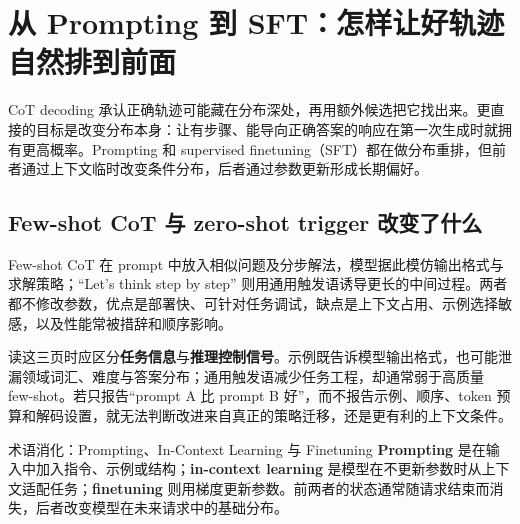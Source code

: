 \section{从 Prompting 到 SFT：怎样让好轨迹自然排到前面}

CoT decoding 承认正确轨迹可能藏在分布深处，再用额外候选把它找出来。更直接的目标是改变分布本身：让有步骤、能导向正确答案的响应在第一次生成时就拥有更高概率。Prompting 和 supervised finetuning（SFT）都在做分布重排，但前者通过上下文临时改变条件分布，后者通过参数更新形成长期偏好。


\subsection{Few-shot CoT 与 zero-shot trigger 改变了什么}

Few-shot CoT 在 prompt 中放入相似问题及分步解法，模型据此模仿输出格式与求解策略；“Let's think step by step” 则用通用触发语诱导更长的中间过程。两者都不修改参数，优点是部署快、可针对任务调试，缺点是上下文占用、示例选择敏感，以及性能常被措辞和顺序影响。




读这三页时应区分\textbf{任务信息}与\textbf{推理控制信号}。示例既告诉模型输出格式，也可能泄漏领域词汇、难度与答案分布；通用触发语减少任务工程，却通常弱于高质量 few-shot。若只报告“prompt A 比 prompt B 好”，而不报告示例、顺序、token 预算和解码设置，就无法判断改进来自真正的策略迁移，还是更有利的上下文条件。


\begin{knowledgebox}{术语消化：Prompting、In-Context Learning 与 Finetuning}
\textbf{Prompting} 是在输入中加入指令、示例或结构；\textbf{in-context learning} 是模型在不更新参数时从上下文适配任务；\textbf{finetuning} 则用梯度更新参数。前两者的状态通常随请求结束而消失，后者改变模型在未来请求中的基础分布。
\end{knowledgebox}

